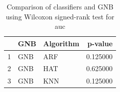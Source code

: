 \begin{table}
\footnotesize
\caption{Comparison of classifiers and GNB using Wilcoxon signed-rank test for auc}
\label{tab:GNB wilcoxon AUC comparison}
\begin{tabular}{lllr}
\hline
 & GNB & Algorithm & p-value \\
\hline
1 & GNB & ARF & 0.125000 \\
2 & GNB & HAT & 0.625000 \\
3 & GNB & KNN & 0.125000 \\
\hline
\end{tabular}
\end{table}
